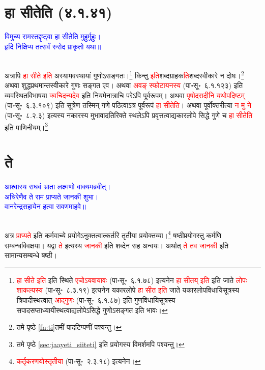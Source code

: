\section[हा सीतेति]{हा सीतेति (४.१.४१)}
\centering\textcolor{blue}{विमुच्य रामस्तद्दृष्ट्वा हा सीतेति मुहुर्मुहुः।\nopagebreak\\
हृदि निक्षिप्य तत्सर्वं रुरोद प्राकृतो यथा॥}\nopagebreak\\
\\
\begin{sloppypar}\justifying\noindent\hspace{10mm} अत्रापि \textcolor{red}{हा सीते इति} अस्यामवस्थायां गुणोऽसङ्गतः।\footnote{\textcolor{red}{हा सीते इति} इति स्थिते \textcolor{red}{एचोऽयवायावः} (पा॰सू॰~६.१.७८) इत्यनेन \textcolor{red}{हा सीतय् इति} इति जाते \textcolor{red}{लोपः शाकल्यस्य} (पा॰सू॰~८.३.१९) इत्यनेन यकारलोपे \textcolor{red}{हा सीत इति} जाते यकार\-लोप\-विधायि\-सूत्रस्य त्रिपादीस्थत्वात् \textcolor{red}{आद्गुणः} (पा॰सू॰~६.१.८७) इति गुण\-विधायि\-सूत्रस्य सपाद\-सप्ताध्यायी\-स्थत्वाद्यलोपेऽसिद्धे गुणोऽसङ्गत इति भावः।} किन्तु \textcolor{red}{इति}\-शब्द\-ग्राहक\-\textcolor{red}{ति}\-शब्द\-स्वीकारे न दोषः।\footnote{\pageref{fn:ti}तमे पृष्ठे \ref{fn:ti}तमीं पादटिप्पणीं पश्यन्तु।
} अथवा शुद्ध\-प्रथमान्त\-स्वीकारे गुणः सङ्गत एव। अथवा \textcolor{red}{अवङ् स्फोटायनस्य} (पा॰सू॰~६.१.१२३) इति व्यवस्थित\-विभाषया \textcolor{red}{क्वचिदन्यदेव} इति नियमेनात्राचि परेऽपि पूर्व\-रूपम्। अथवा \textcolor{red}{पृषोदरादीनि यथोपदिष्टम्‌} (पा॰सू॰~६.३.१०९) इति सूत्रेण तस्मिन् गणे पठित्वाऽत्र पूर्व\-रूपं \textcolor{red}{हा सीतेति}। अथवा पूर्वोक्त\-रीत्या \textcolor{red}{न मु ने} (पा॰सू॰~८.२.३) इत्यस्य नकारस्य मुभावादतिरिक्ते स्थलेऽपि प्रवृत्तत्वाद्यकारलोपे सिद्धे गुणे च \textcolor{red}{हा सीतेति} इति पाणिनीयम्।\footnote{\pageref{sec:jaayeti_siiteti}तमे पृष्ठे \ref{sec:jaayeti_siiteti}  इति प्रयोगस्य विमर्शमपि पश्यन्तु।}\end{sloppypar}
\section[ते]{ते}
\centering\textcolor{blue}{आश्वास्य राघवं भ्राता लक्ष्मणो वाक्यमब्रवीत्।\nopagebreak\\
अचिरेणैव ते राम प्राप्यते जानकी शुभा।\nopagebreak\\
वानरेन्द्रसहायेन हत्वा रावणमाहवे॥}\nopagebreak\\
\\
\begin{sloppypar}\justifying\noindent\hspace{10mm} अत्र \textcolor{red}{प्राप्यते} इति कर्म\-वाच्ये प्रयोगेऽनुक्तत्वात्कर्तरि तृतीया प्रयोक्तव्या।\footnote{\textcolor{red}{कर्तृ\-करणयोस्तृतीया} (पा॰सू॰~२.३.१८) इत्यनेन।} षष्ठी\-प्रयोगस्तु कर्मणि सम्बन्ध\-विवक्षया। यद्वा \textcolor{red}{ते} इत्यस्य \textcolor{red}{जानकी} इति शब्देन सह अन्वयः। अर्थात् \textcolor{red}{ते तव जानकी} इति सामान्य\-सम्बन्धे षष्ठी।\end{sloppypar}
